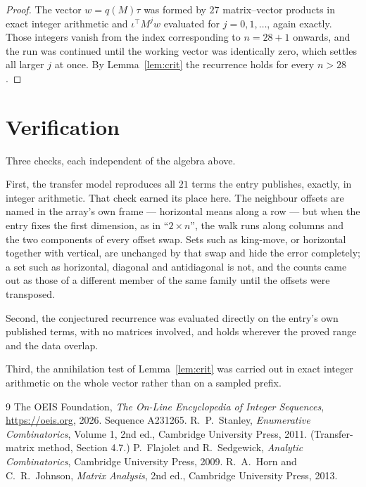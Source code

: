 \documentclass[11pt,a4paper]{article}
\theoremstyle{plain}
\theoremstyle{definition}
\begin{document}
\begin{proof}
The vector $w=q(M)\tau$ was formed by $27$ matrix--vector products in exact integer
arithmetic and $\iota^{\!\top}M^{j}w$ evaluated for $j=0,1,\dots$, again exactly. Those
integers vanish from the index corresponding to $n=28+1$ onwards, and the run was
continued until the working vector was identically zero, which settles all larger $j$ at once.
By Lemma~\ref{lem:crit} the recurrence holds for every $n>28$.
\end{proof}

\section{Verification}

Three checks, each independent of the algebra above.

First, the transfer model reproduces all $21$ terms the entry publishes, exactly, in
integer arithmetic. That check earned its place here. The neighbour offsets are named in the
array's own frame --- horizontal means along a row --- but when the entry fixes the first
dimension, as in ``$2\times n$'', the walk runs along columns and the two components of every
offset swap. Sets such as king-move, or horizontal together with vertical, are unchanged by
that swap and hide the error completely; a set such as horizontal, diagonal and antidiagonal
is not, and the counts came out as those of a different member of the same family until the
offsets were transposed.

Second, the conjectured recurrence was evaluated directly on the entry's own published terms,
with no matrices involved, and holds wherever the proved range and the data overlap.

Third, the annihilation test of Lemma~\ref{lem:crit} was carried out in exact integer
arithmetic on the whole vector rather than on a sampled prefix.

\begin{thebibliography}{9}
 The OEIS Foundation, \emph{The On-Line Encyclopedia of Integer
Sequences}, \url{https://oeis.org}, 2026. Sequence A231265.
 R.~P.~Stanley, \emph{Enumerative Combinatorics}, Volume 1, 2nd ed.,
Cambridge University Press, 2011. (Transfer-matrix method, Section 4.7.)
 P.~Flajolet and R.~Sedgewick, \emph{Analytic Combinatorics}, Cambridge
University Press, 2009.
 R.~A.~Horn and C.~R.~Johnson, \emph{Matrix Analysis}, 2nd ed., Cambridge
University Press, 2013.
\end{thebibliography}
\end{document}
